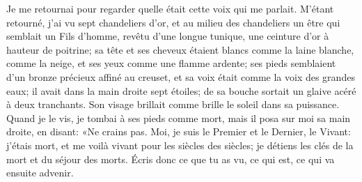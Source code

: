 Je me retournai pour regarder quelle était cette voix qui me parlait.
M’étant retourné, j’ai vu sept chandeliers d’or,
	et au milieu des chandeliers un être qui semblait un Fils d’homme,
	revêtu d’une longue tunique, une ceinture d’or à hauteur de poitrine;
	sa tête et ses cheveux étaient blancs
		comme la laine blanche, comme la neige,
	et ses yeux comme une flamme ardente;
	ses pieds semblaient d’un bronze précieux affiné au creuset,
	et sa voix était comme la voix des grandes eaux;
	il avait dans la main droite sept étoiles;
	de sa bouche sortait un glaive acéré à deux tranchants.
Son visage brillait comme brille le soleil dans sa puissance.
Quand je le vis, je tombai à ses pieds comme mort,
	mais il posa sur moi sa main droite, en disant:
	«Ne crains pas.
Moi, je suis le Premier et le Dernier, le Vivant:
	j’étais mort, et me voilà vivant pour les siècles des siècles;
	je détiens les clés de la mort et du séjour des morts.
Écris donc ce que tu as vu, ce qui est, ce qui va ensuite advenir.
